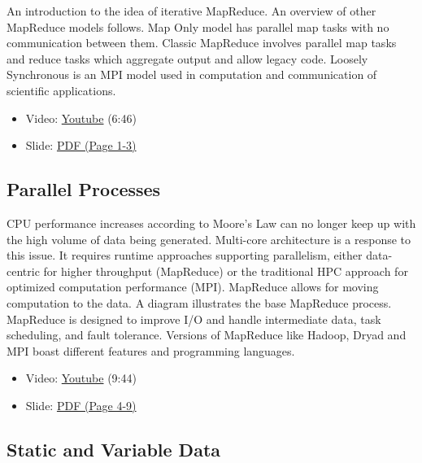 An introduction to the idea of iterative MapReduce. An overview of other
MapReduce models follows. Map Only model has parallel map tasks with no
communication between them. Classic MapReduce involves parallel map
tasks and reduce tasks which aggregate output and allow legacy code.
Loosely Synchronous is an MPI model used in computation and
communication of scientific applications.

\begin{itemize}
\tightlist
\item
  Video: \href{https://www.youtube.com/watch?v=CXDdWmAWIvk}{Youtube}
  (6:46)
\item
  Slide:
  \href{https://drive.google.com/open?id=0B88HKpainTSfMFBaNHprbWJwQms}{PDF
  (Page 1-3)}
\end{itemize}

\subsection{Parallel Processes}\label{parallel-processes}

CPU performance increases according to Moore's Law can no longer keep up
with the high volume of data being generated. Multi-core architecture is
a response to this issue. It requires runtime approaches supporting
parallelism, either data-centric for higher throughput (MapReduce) or
the traditional HPC approach for optimized computation performance
(MPI). MapReduce allows for moving computation to the data. A diagram
illustrates the base MapReduce process. MapReduce is designed to improve
I/O and handle intermediate data, task scheduling, and fault tolerance.
Versions of MapReduce like Hadoop, Dryad and MPI boast different
features and programming languages.

\begin{itemize}
\tightlist
\item
  Video: \href{https://www.youtube.com/watch?v=JAYvkIZ8TuE}{Youtube}
  (9:44)
\item
  Slide:
  \href{https://drive.google.com/open?id=0B88HKpainTSfMFBaNHprbWJwQms}{PDF
  (Page 4-9)}
\end{itemize}

\subsection{Static and Variable Data}\label{static-and-variable-data}

